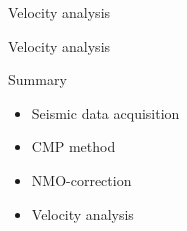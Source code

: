 \documentclass[xcolor=dvipsnames,notes]{beamer}
\begin{document}
\begin{frame}{Velocity analysis}
\end{frame}
\begin{frame}{Velocity analysis}
\end{frame}
\begin{frame}{Summary}
\begin{itemize}
  \item Seismic data acquisition
   \item CMP method
   \item NMO-correction
   \item Velocity analysis
  \end{itemize}
%
\end{frame}
\end{document}
